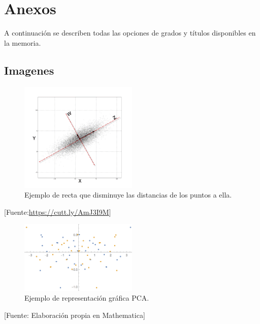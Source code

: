\chapter{Anexos}
\label{ch:Anexos}

A continuación se describen todas las opciones de grados y títulos disponibles en la memoria.

\section{Imagenes}

\begin{figure}[H]
    \centering
    \caption{\label{fig:rectaPCA} Ejemplo de recta que disminuye las distancias de los puntos a ella.}
    \includegraphics[width=0.5\textwidth]{figures/graficaRectaPCA.png}
\end{figure}
\begin{center}
    [Fuente:\href{https://cutt.ly/AmJ3I9M}{https://cutt.ly/AmJ3I9M}] \cite{Mohamed}
\end{center}

\begin{figure}[H]
    \centering
    \caption{\label{fig:representacionPCA} Ejemplo de  representación gráfica PCA.}
    \includegraphics[width=0.5\textwidth]{figures/Dplot.png}
\end{figure}
\begin{center}
    [Fuente: Elaboración propia en Mathematica] 
\end{center}

